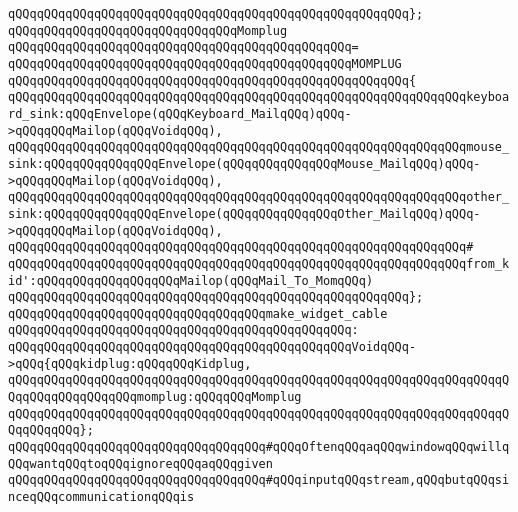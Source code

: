 \verb|qQQqqQQqqQQqqQQqqQQqqQQqqQQqqQQqqQQqqQQqqQQqqQQqqQQqqQQq};|\newline
\newline
\verb|qQQqqQQqqQQqqQQqqQQqqQQqqQQqqQQqMomplug|\newline
\verb|qQQqqQQqqQQqqQQqqQQqqQQqqQQqqQQqqQQqqQQqqQQqqQQq=|\newline
\verb|qQQqqQQqqQQqqQQqqQQqqQQqqQQqqQQqqQQqqQQqqQQqqQQqMOMPLUG|\newline
\verb|qQQqqQQqqQQqqQQqqQQqqQQqqQQqqQQqqQQqqQQqqQQqqQQqqQQqqQQq{|\newline
\verb|qQQqqQQqqQQqqQQqqQQqqQQqqQQqqQQqqQQqqQQqqQQqqQQqqQQqqQQqqQQqqQQqkeyboard_sink:qQQqEnvelope(qQQqKeyboard_MailqQQq)qQQq->qQQqqQQqMailop(qQQqVoidqQQq),|\newline
\verb|qQQqqQQqqQQqqQQqqQQqqQQqqQQqqQQqqQQqqQQqqQQqqQQqqQQqqQQqqQQqqQQqmouse_sink:qQQqqQQqqQQqqQQqEnvelope(qQQqqQQqqQQqqQQqMouse_MailqQQq)qQQq->qQQqqQQqMailop(qQQqVoidqQQq),|\newline
\verb|qQQqqQQqqQQqqQQqqQQqqQQqqQQqqQQqqQQqqQQqqQQqqQQqqQQqqQQqqQQqqQQqother_sink:qQQqqQQqqQQqqQQqEnvelope(qQQqqQQqqQQqqQQqOther_MailqQQq)qQQq->qQQqqQQqMailop(qQQqVoidqQQq),|\newline
\verb|qQQqqQQqqQQqqQQqqQQqqQQqqQQqqQQqqQQqqQQqqQQqqQQqqQQqqQQqqQQqqQQq#|\newline
\verb|qQQqqQQqqQQqqQQqqQQqqQQqqQQqqQQqqQQqqQQqqQQqqQQqqQQqqQQqqQQqqQQqfrom_kid':qQQqqQQqqQQqqQQqqQQqMailop(qQQqMail_To_MomqQQq)|\newline
\verb|qQQqqQQqqQQqqQQqqQQqqQQqqQQqqQQqqQQqqQQqqQQqqQQqqQQqqQQq};|\newline
\newline
\verb|qQQqqQQqqQQqqQQqqQQqqQQqqQQqqQQqqQQqmake_widget_cable|\newline
\verb|qQQqqQQqqQQqqQQqqQQqqQQqqQQqqQQqqQQqqQQqqQQqqQQq:|\newline
\verb|qQQqqQQqqQQqqQQqqQQqqQQqqQQqqQQqqQQqqQQqqQQqqQQqVoidqQQq->qQQq{qQQqkidplug:qQQqqQQqKidplug,|\newline
\verb|qQQqqQQqqQQqqQQqqQQqqQQqqQQqqQQqqQQqqQQqqQQqqQQqqQQqqQQqqQQqqQQqqQQqqQQqqQQqqQQqqQQqqQQqmomplug:qQQqqQQqMomplug|\newline
\verb|qQQqqQQqqQQqqQQqqQQqqQQqqQQqqQQqqQQqqQQqqQQqqQQqqQQqqQQqqQQqqQQqqQQqqQQqqQQqqQQq};|\newline
\newline
\verb|qQQqqQQqqQQqqQQqqQQqqQQqqQQqqQQqqQQq#qQQqOftenqQQqaqQQqwindowqQQqwillqQQqwantqQQqtoqQQqignoreqQQqaqQQqgiven|\newline
\verb|qQQqqQQqqQQqqQQqqQQqqQQqqQQqqQQqqQQq#qQQqinputqQQqstream,qQQqbutqQQqsinceqQQqcommunicationqQQqis|\newline
